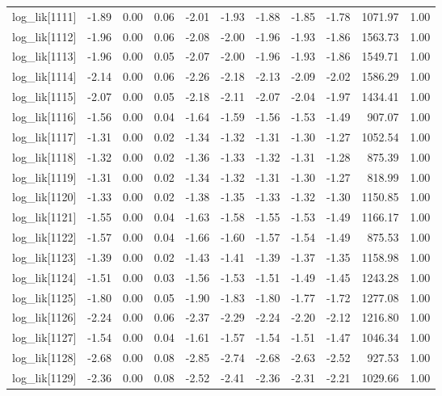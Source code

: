 \begin{table}[ht]
\begin{tabular}{rrrrrrrrrrr}
  log\_lik[1111] & -1.89 & 0.00 & 0.06 & -2.01 & -1.93 & -1.88 & -1.85 & -1.78 & 1071.97 & 1.00 \\ 
  log\_lik[1112] & -1.96 & 0.00 & 0.06 & -2.08 & -2.00 & -1.96 & -1.93 & -1.86 & 1563.73 & 1.00 \\ 
  log\_lik[1113] & -1.96 & 0.00 & 0.05 & -2.07 & -2.00 & -1.96 & -1.93 & -1.86 & 1549.71 & 1.00 \\ 
  log\_lik[1114] & -2.14 & 0.00 & 0.06 & -2.26 & -2.18 & -2.13 & -2.09 & -2.02 & 1586.29 & 1.00 \\ 
  log\_lik[1115] & -2.07 & 0.00 & 0.05 & -2.18 & -2.11 & -2.07 & -2.04 & -1.97 & 1434.41 & 1.00 \\ 
  log\_lik[1116] & -1.56 & 0.00 & 0.04 & -1.64 & -1.59 & -1.56 & -1.53 & -1.49 & 907.07 & 1.00 \\ 
  log\_lik[1117] & -1.31 & 0.00 & 0.02 & -1.34 & -1.32 & -1.31 & -1.30 & -1.27 & 1052.54 & 1.00 \\ 
  log\_lik[1118] & -1.32 & 0.00 & 0.02 & -1.36 & -1.33 & -1.32 & -1.31 & -1.28 & 875.39 & 1.00 \\ 
  log\_lik[1119] & -1.31 & 0.00 & 0.02 & -1.34 & -1.32 & -1.31 & -1.30 & -1.27 & 818.99 & 1.00 \\ 
  log\_lik[1120] & -1.33 & 0.00 & 0.02 & -1.38 & -1.35 & -1.33 & -1.32 & -1.30 & 1150.85 & 1.00 \\ 
  log\_lik[1121] & -1.55 & 0.00 & 0.04 & -1.63 & -1.58 & -1.55 & -1.53 & -1.49 & 1166.17 & 1.00 \\ 
  log\_lik[1122] & -1.57 & 0.00 & 0.04 & -1.66 & -1.60 & -1.57 & -1.54 & -1.49 & 875.53 & 1.00 \\ 
  log\_lik[1123] & -1.39 & 0.00 & 0.02 & -1.43 & -1.41 & -1.39 & -1.37 & -1.35 & 1158.98 & 1.00 \\ 
  log\_lik[1124] & -1.51 & 0.00 & 0.03 & -1.56 & -1.53 & -1.51 & -1.49 & -1.45 & 1243.28 & 1.00 \\ 
  log\_lik[1125] & -1.80 & 0.00 & 0.05 & -1.90 & -1.83 & -1.80 & -1.77 & -1.72 & 1277.08 & 1.00 \\ 
  log\_lik[1126] & -2.24 & 0.00 & 0.06 & -2.37 & -2.29 & -2.24 & -2.20 & -2.12 & 1216.80 & 1.00 \\ 
  log\_lik[1127] & -1.54 & 0.00 & 0.04 & -1.61 & -1.57 & -1.54 & -1.51 & -1.47 & 1046.34 & 1.00 \\ 
  log\_lik[1128] & -2.68 & 0.00 & 0.08 & -2.85 & -2.74 & -2.68 & -2.63 & -2.52 & 927.53 & 1.00 \\ 
  log\_lik[1129] & -2.36 & 0.00 & 0.08 & -2.52 & -2.41 & -2.36 & -2.31 & -2.21 & 1029.66 & 1.00 \\ 

\end{tabular}
\end{table}

